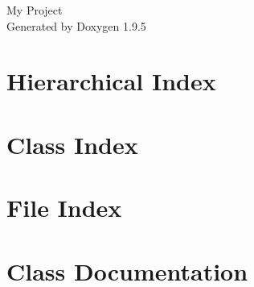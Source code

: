 \documentclass[twoside]{book}
\newcommand{\+}{\discretionary{\mbox{\scriptsize$\hookleftarrow$}}{}{}}
\newcommand{\clearemptydoublepage}{%
    \newpage{\pagestyle{empty}\cleardoublepage}%
  }
\begin{document}
  \raggedbottom
    \hypersetup{pageanchor=false,
                bookmarksnumbered=true,
                pdfencoding=unicode
               }
  \begin{titlepage}
  \vspace*{7cm}
  \begin{center}%
  {\Large My Project}\\
  \vspace*{1cm}
  {\large Generated by Doxygen 1.9.5}\\
  \end{center}
  \end{titlepage}
  \clearemptydoublepage
  \tableofcontents
  \clearemptydoublepage
  \hypersetup{pageanchor=true}
\chapter{Hierarchical Index}

\chapter{Class Index}

\chapter{File Index}

\chapter{Class Documentation}





















\end{document}

